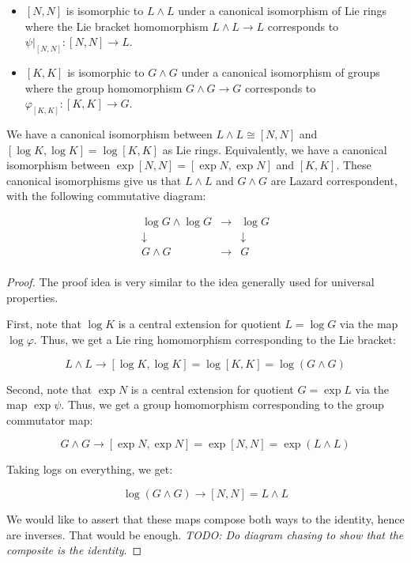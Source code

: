 \documentclass[10pt]{amsart}
\begin{document}
\begin{itemize}
\item $[N,N]$ is isomorphic to $L \wedge L$ under a canonical
  isomorphism of Lie rings where the Lie bracket homomorphism $L
  \wedge L \to L$ corresponds to $\psi|_{[N,N]}: [N,N] \to L$.
\item $[K,K]$ is isomorphic to $G \wedge G$ under a canonical
  isomorphism of groups where the group homomorphism $G \wedge G \to
  G$ corresponds to $\varphi_{[K,K]}: [K,K] \to G$.
\end{itemize}

\begin{lemma}
  We have a canonical isomorphism between $L \wedge L \cong [N,N]$ and
  $[\log K,\log K] = \log [K,K]$ as Lie rings. Equivalently, we have a
  canonical isomorphism between $\exp [N,N] = [\exp N, \exp N]$ and
  $[K,K]$. These canonical isomorphisms give us that $L \wedge L$ and
  $G \wedge G$ are Lazard correspondent, with the following
  commutative diagram:

  \begin{eqnarray*}
    \log G \wedge \log G & \rightarrow & \log G\\
    \downarrow & & \downarrow\\
    G \wedge G & \rightarrow & G \\
  \end{eqnarray*}

\end{lemma}

\begin{proof}
  The proof idea is very similar to the idea generally used for
  universal properties.

  First, note that $\log K$ is a central extension for quotient $L =
  \log G$ via the map $\log \varphi$. Thus, we get a Lie ring
  homomorphism corresponding to the Lie bracket:

  $$L \wedge L \to [\log K,\log K] = \log[K,K] = \log(G \wedge G)$$

  Second, note that $\exp N$ is a central extension for quotient $G =
  \exp L$ via the map $\exp \psi$. Thus, we get a group homomorphism
  corresponding to the group commutator map:

  $$G \wedge G \to [\exp N,\exp N] = \exp[N,N] = \exp(L \wedge L)$$

  Taking logs on everything, we get:

  $$\log(G \wedge G) \to [N,N] = L \wedge L$$

  We would like to assert that these maps compose both ways to the
  identity, hence are inverses. That would be enough. {\em TODO: Do
  diagram chasing to show that the composite is the identity}.
\end{proof}
\end{document}
